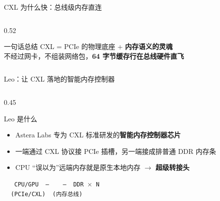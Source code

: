 \documentclass[aspectratio=169, 8pt, UTF8]{ctexbeamer}
\begin{document}
\begin{frame}{CXL 为什么快：总线级内存直连}
\begin{columns}[T]
\begin{column}{0.52\textwidth}
      \vspace{6pt}

      \begin{block}{一句话总结}
        \centering
        CXL = PCIe 的物理底座 + \textbf{内存语义的灵魂}\\[4pt]
        不经过网卡，不组装网络包，\textbf{64 字节缓存行在总线硬件直飞}
      \end{block}
    \end{column}
  \end{columns}
\end{frame}

\begin{frame}{Leo：让 CXL 落地的智能内存控制器}
  \begin{columns}[T]
    \begin{column}{0.45\textwidth}
      \begin{block}{Leo 是什么}
        \begin{itemize}
          \item Astera Labs 专为 CXL 标准研发的\textbf{智能内存控制器芯片}
          \item 一端通过 CXL 协议接 PCIe 插槽，另一端接成排普通 DDR 内存条
          \item CPU ``误以为''远端内存就是原生本地内存 $\to$ \textbf{超级转接头}
        \end{itemize}
      \end{block}

      \vspace{6pt}
      \begin{center}
        \texttt{%
        \ \ CPU/GPU\ \ ---\ \ \ \ ---\ \ DDR $\times$ N\\[4pt]
        \ \ (PCIe/CXL)\qquad\ \ (内存总线)%
        }
      \end{center}


\end{column}
\end{columns}
\end{frame}
\end{document}
